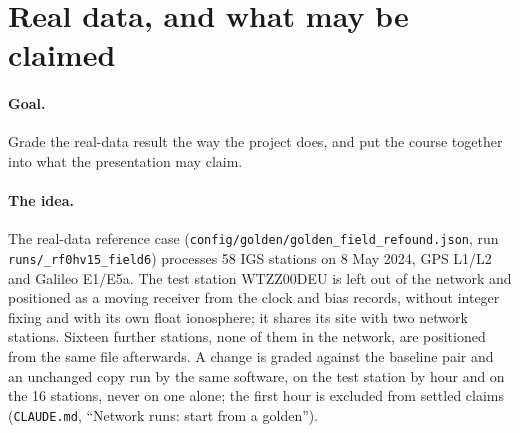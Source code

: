 
\section{Real data, and what may be claimed}\label{sec:l9}

\paragraph{Goal.} Grade the real-data result the way the project does, and put the
course together into what the presentation may claim.

\paragraph{The idea.} The real-data reference case
(\texttt{config/golden/golden\_field\_refound.json}, run \texttt{runs/\_rf0hv15\_field6})
processes 58 IGS stations on 8 May 2024, GPS L1/L2 and Galileo E1/E5a. The test
station WTZZ00DEU is left out of the network and positioned as a moving receiver
from the clock and bias records, without integer fixing and with its own float
ionosphere; it shares its site with two network stations. Sixteen further
stations, none of them in the network, are positioned from the same file
afterwards. A change is graded against the baseline pair and an unchanged copy run
by the same software, on the test station by hour and on the 16 stations, never on
one alone; the first hour is excluded from settled claims (\texttt{CLAUDE.md},
``Network runs: start from a golden'').

